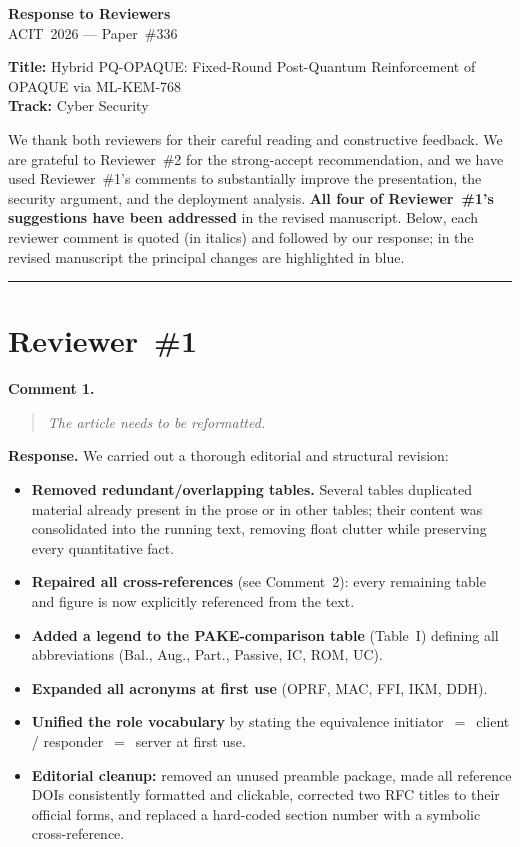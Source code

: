 \documentclass[11pt,a4paper]{article}
\newcommand{\rc}[1]{\par\smallskip\begin{quote}\textcolor{rcol}{\itshape #1}\end{quote}\par}
\begin{document}
\begin{center}
{\LARGE\bfseries Response to Reviewers}\\[0.6em]
{\large ACIT~2026 --- Paper~\#336}
\end{center}

\medskip
\noindent\textbf{Title:} Hybrid PQ-OPAQUE: Fixed-Round Post-Quantum Reinforcement of OPAQUE via ML-KEM-768\\
\textbf{Track:} Cyber Security

\bigskip
\noindent We thank both reviewers for their careful reading and constructive feedback. We are grateful to Reviewer~\#2 for the strong-accept recommendation, and we have used Reviewer~\#1's comments to substantially improve the presentation, the security argument, and the deployment analysis. \textbf{All four of Reviewer~\#1's suggestions have been addressed} in the revised manuscript. Below, each reviewer comment is quoted (in italics) and followed by our response; in the revised manuscript the principal changes are highlighted in blue.

\bigskip
\hrule
\section*{Reviewer~\#1}

\noindent\textbf{Comment 1.}
\rc{The article needs to be reformatted.}
\noindent\textbf{Response.} We carried out a thorough editorial and structural revision:
\begin{itemize}
  \item \textbf{Removed redundant/overlapping tables.} Several tables duplicated material already present in the prose or in other tables; their content was consolidated into the running text, removing float clutter while preserving every quantitative fact.
  \item \textbf{Repaired all cross-references} (see Comment~2): every remaining table and figure is now explicitly referenced from the text.
  \item \textbf{Added a legend to the PAKE-comparison table} (Table~I) defining all abbreviations (Bal., Aug., Part., Passive, IC, ROM, UC).
  \item \textbf{Expanded all acronyms at first use} (OPRF, MAC, FFI, IKM, DDH).
  \item \textbf{Unified the role vocabulary} by stating the equivalence initiator~$=$~client / responder~$=$~server at first use.
  \item \textbf{Editorial cleanup:} removed an unused preamble package, made all reference DOIs consistently formatted and clickable, corrected two RFC titles to their official forms, and replaced a hard-coded section number with a symbolic cross-reference.
\end{itemize}
\end{document}
